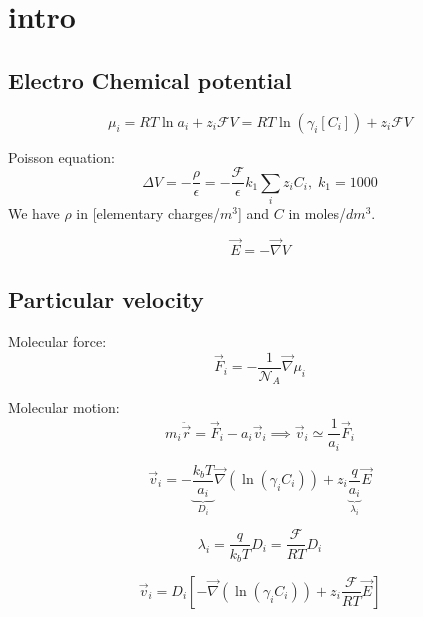 \documentclass[aps,12pt]{revtex4}
\begin{document}
\section{intro}

\subsection{Electro Chemical potential}



\begin{equation}
	\mu_i = RT \ln a_i + z_i \mathcal{F} V = RT \ln (\gamma_i[C_i]) + z_i \mathcal{F} V
\end{equation}

Poisson equation:
\begin{equation}
	\Delta V = - \dfrac{\rho}{\epsilon} = -\dfrac{\mathcal{F}}{\epsilon} k_1 \sum_i z_i C_i,\;k_1=1000
\end{equation}
We have $\rho$ in [elementary charges/$m^3$] and $C$ in moles/$dm^3$.

\begin{equation}
	\vec{E} = -\vec{\nabla} V
\end{equation}

\subsection{Particular velocity}
Molecular force:	
\begin{equation}
	\vec{F}_i = - \frac{1}{\mathcal{N}_A} \vec{\nabla} \mu_i
\end{equation}

Molecular motion:
\begin{equation}
	m_i \ddot {\vec{r}} = \vec{F}_i - a_i \vec{v}_i \implies \vec{v}_i \simeq \dfrac{1}{a_i} \vec{F}_i
\end{equation}

\begin{equation}
	\vec{v}_i = -\underbrace{\dfrac{k_bT}{a_i}}_{D_i} \vec{\nabla}(\ln(\gamma_i C_i))  + z_i \underbrace{\dfrac{ q}{a_i}}_{\lambda_i} \vec{E}
\end{equation}

\begin{equation}
	\lambda_i = \frac{q}{k_bT} D_i = \dfrac{\mathcal{F}}{RT} D_i
\end{equation}

\begin{equation}
\boxed{
	\vec{v}_i = D_i \left[ - \vec{\nabla}(\ln(\gamma_i C_i)) + z_i \dfrac{\mathcal{F}}{RT} \vec{E} \right]
}
\end{equation}
\end{document}
